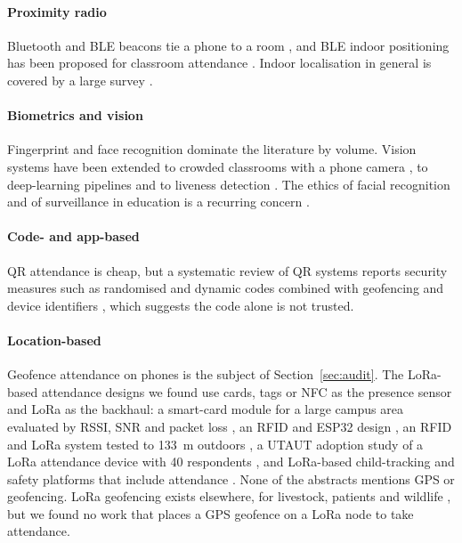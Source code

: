 \documentclass[12pt]{article}
\let\cite\citep
\begin{document}
\paragraph{Proximity radio} Bluetooth and BLE beacons tie a phone to a room \cite{noguchi2015student,lodha2015bluetooth}, and BLE indoor positioning has been proposed for classroom attendance \cite{puckdeevongs2020classroom}. Indoor localisation in general is covered by a large survey \cite{zafari2019survey}.

\paragraph{Biometrics and vision} Fingerprint \cite{mohamed2012fingerprint,mittal2015fingerprint,zainal2014design} and face recognition \cite{bah2020improved,arsenovic2017facetime,wagh2015attendance,sunaryono2021android,alhanaee2021face} dominate the literature by volume. Vision systems have been extended to crowded classrooms with a phone camera \cite{mery2019student}, to deep-learning pipelines \cite{fu2017university} and to liveness detection \cite{surantha2024lightweight}. The ethics of facial recognition and of surveillance in education is a recurring concern \cite{almeida2021ethics,pea2022four}.

\paragraph{Code- and app-based} QR attendance \cite{masalha2014students} is cheap, but a systematic review of QR systems reports security measures such as randomised and dynamic codes combined with geofencing and device identifiers \cite{jodihendrawan2025code}, which suggests the code alone is not trusted.

\paragraph{Location-based} Geofence attendance on phones is the subject of Section~\ref{sec:audit}. The LoRa-based attendance designs we found use cards, tags or NFC as the presence sensor and LoRa as the backhaul: a smart-card module for a large campus area evaluated by RSSI, SNR and packet loss \cite{noprianto2023application}, an RFID and ESP32 design \cite{karuppanan2026digitalized}, an RFID and LoRa system tested to 133~m outdoors \cite{khurshid2025fusion}, a UTAUT adoption study of a LoRa attendance device with 40 respondents \cite{seta2023adoption}, and LoRa-based child-tracking and safety platforms that include attendance \cite{ztrk2019design,s2024safecomm}. None of the abstracts mentions GPS or geofencing. LoRa geofencing exists elsewhere, for livestock, patients and wildlife \cite{ahmed2024scalable,j2026fencing,andika2026lora,lopezescobar2025wildlife}, but we found no work that places a GPS geofence on a LoRa node to take attendance.
\end{document}
